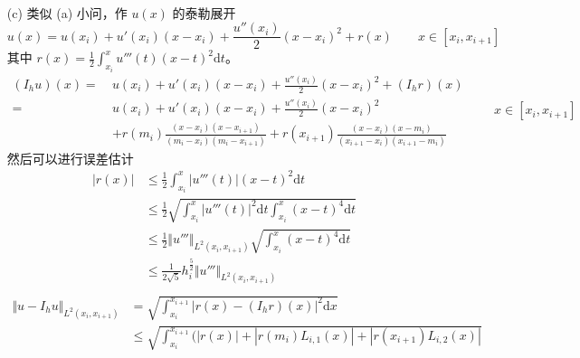 \documentclass[a4paper]{article}
\begin{document}
\begin{enumerate}
\begin{align}
            \end{align}
    \item[(c)] 类似 (a) 小问，作 $u(x)$ 的泰勒展开
            \begin{equation}
                u(x) = u(x_i) + u'(x_i)(x-x_i) + \frac{u''(x_i)}{2}(x-x_i)^2 + r(x)
                \qquad x\in [x_i, x_{i+1}]
            \end{equation}
            其中 $r(x)=\frac{1}{2}\int_{x_i}^{x}u'''(t)(x-t)^2\text{d}t$。
            \begin{equation}
                \begin{aligned}
                    (I_h u)(x) = \ &u(x_i) + u'(x_i)(x-x_i) + \frac{u''(x_i)}{2}(x-x_i)^2 + (I_h r)(x)\\
                               = \ &u(x_i) + u'(x_i)(x-x_i) + \frac{u''(x_i)}{2}(x-x_i)^2\\ 
                               &+ r(m_i)\frac{(x-x_i)(x-x_{i+1})}{(m_i-x_i)(m_i-x_{i+1})}
                               + r(x_{i+1})\frac{(x-x_i)(x-m_i)}{(x_{i+1}-x_i)(x_{i+1}-m_i)}
                \end{aligned}
                \qquad x\in [x_i, x_{i+1}]
            \end{equation}
            然后可以进行误差估计
            \begin{equation}
                \begin{aligned}
                    |r(x)| &\leq \frac{1}{2}\int_{x_i}^{x}|u'''(t)|(x-t)^2\text{d}t\\
                    &\leq \frac{1}{2} \sqrt{\int_{x_i}^{x}|u'''(t)|^2\text{d}t \int_{x_i}^{x}(x-t)^4\text{d}t}\\
                    &\leq \frac{1}{2} \Vert u''' \Vert_{L^2(x_i,x_{i+1})} \sqrt{\int_{x_i}^{x}(x-t)^4\text{d}t}\\
                    &\leq \frac{1}{2\sqrt{5}} h_i^{\frac{5}{2}} \Vert u''' \Vert_{L^2(x_i,x_{i+1})}\\
                \end{aligned}
            \end{equation}
            \begin{equation}
                \begin{aligned}
                    \Vert u-I_h u \Vert_{L^2(x_i,x_{i+1})}
                    &= \sqrt{\int_{x_i}^{x_{i+1}}|r(x)- (I_h r)(x)|^2\text{d}x}\\
                    &\leq \sqrt{\int_{x_i}^{x_{i+1}}\big(
                        |r(x)| + |r(m_i)L_{i,1}(x)|
                        + |r(x_{i+1})L_{i,2}(x)|
}
\end{aligned}
\end{equation}
\end{enumerate}
\end{document}
